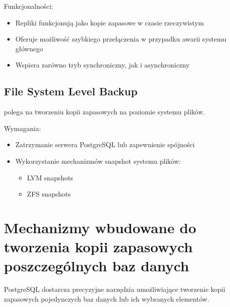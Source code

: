 \documentclass[letterpaper,10pt,polish]{sphinxmanual}
\begin{document}
\sphinxAtStartPar
Funkcjonalności:
\begin{itemize}
\item {} 
\sphinxAtStartPar
Repliki funkcjonują jako kopie zapasowe w czasie rzeczywistym

\item {} 
\sphinxAtStartPar
Oferuje możliwość szybkiego przełączenia w przypadku awarii systemu głównego

\item {} 
\sphinxAtStartPar
Wspiera zarówno tryb synchroniczny, jak i asynchroniczny

\end{itemize}


\subsection{File System Level Backup}
\label{\detokenize{kopie_zapasowe_i_odzyskiwanie_danych:file-system-level-backup}}
\sphinxAtStartPar
{} polega na tworzeniu kopii zapasowych na poziomie systemu plików.

\sphinxAtStartPar
Wymagania:
\begin{itemize}
\item {} 
\sphinxAtStartPar
Zatrzymanie serwera PostgreSQL lub zapewnienie spójności

\item {} 
\sphinxAtStartPar
Wykorzystanie mechanizmów snapshot systemu plików:
\begin{itemize}
\item {} 
\sphinxAtStartPar
LVM snapshots

\item {} 
\sphinxAtStartPar
ZFS snapshots

\end{itemize}

\end{itemize}


\section{Mechanizmy wbudowane do tworzenia kopii zapasowych poszczególnych baz danych}
\label{\detokenize{kopie_zapasowe_i_odzyskiwanie_danych:mechanizmy-wbudowane-do-tworzenia-kopii-zapasowych-poszczegolnych-baz-danych}}
\sphinxAtStartPar
PostgreSQL dostarcza precyzyjne narzędzia umożliwiające tworzenie kopii zapasowych pojedynczych baz danych lub ich wybranych elementów.
\end{document}
